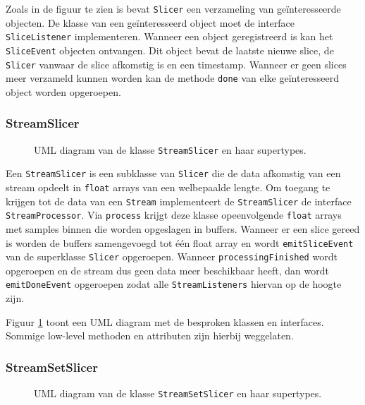 Zoals in de figuur te zien is bevat \texttt{Slicer} een verzameling van geïnteresseerde objecten. De klasse van een geïnteresseerd object moet de interface \texttt{SliceListener} implementeren. Wanneer een object geregistreerd is kan het \texttt{SliceEvent} objecten ontvangen. Dit object bevat de laatste nieuwe slice, de \texttt{Slicer} vanwaar de slice afkomstig is en een timestamp. Wanneer er geen slices meer verzameld kunnen worden kan de methode \texttt{done} van elke geïnteresseerd object worden opgeroepen.

\subsubsection{StreamSlicer}

\begin{figure}[h!]
	\captionsetup{width=0.7\textwidth}
	\caption{UML diagram van de klasse \texttt{StreamSlicer} en haar supertypes.}
	\begin{center}
		\advance\parskip0.3cm
		
	\end{center}
	\label{streamSlicer}
\end{figure}

Een \texttt{StreamSlicer} is een subklasse van \texttt{Slicer} die de data afkomstig van een stream opdeelt in \texttt{float} arrays van een welbepaalde lengte. Om toegang te krijgen tot de data van een \texttt{Stream} implementeert de \texttt{StreamSlicer} de interface \texttt{StreamProcessor}. Via \texttt{process} krijgt deze klasse opeenvolgende \texttt{float} arrays met samples binnen die worden opgeslagen in buffers. Wanneer er een slice gereed is worden de buffers samengevoegd tot één float array en wordt \texttt{emitSliceEvent} van de superklasse \texttt{Slicer} opgeroepen. Wanneer \texttt{processingFinished} wordt opgeroepen en de stream dus geen data meer beschikbaar heeft, dan wordt \texttt{emitDoneEvent} opgeroepen zodat alle \texttt{StreamListeners} hiervan op de hoogte zijn.

Figuur \ref{streamSlicer} toont een UML diagram met de besproken klassen en interfaces. Sommige low-level methoden en attributen zijn hierbij weggelaten. 

\subsubsection{StreamSetSlicer}

\begin{figure}[h!]
	\captionsetup{width=0.7\textwidth}
	\caption{UML diagram van de klasse \texttt{StreamSetSlicer} en haar supertypes.}
	\begin{center}
		\advance\parskip0.3cm
		
	\end{center}
	\label{streamSetSlicer}
\end{figure}


